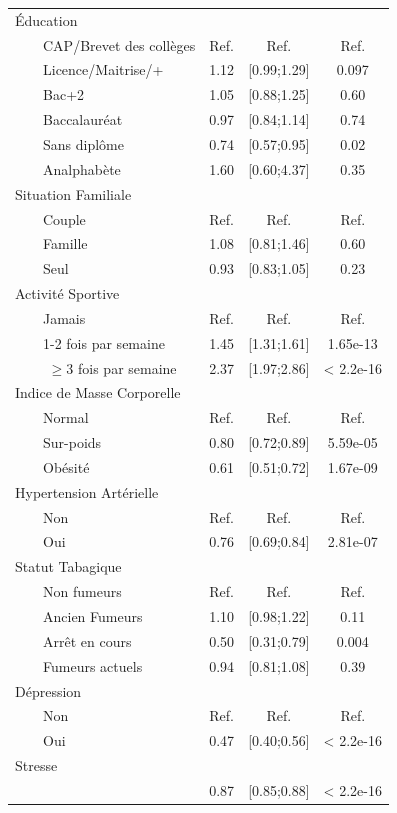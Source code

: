 \documentclass{book}
\begin{document}
\begin{longtable}{lccc}
 
Éducation&&&\\
$\qquad$CAP/Brevet des collèges &Ref.&Ref.&Ref.\\
$\qquad$Licence/Maitrise/+   &1.12 & [0.99;1.29] & 0.097 \\   
$\qquad$Bac+2       &1.05 & [0.88;1.25] & 0.60   \\  
$\qquad$Baccalauréat   &0.97& [0.84;1.14] & 0.74  \\        
$\qquad$Sans diplôme   &0.74 & [0.57;0.95] & 0.02\\
$\qquad$Analphabète &1.60& [0.60;4.37] & 0.35 \\   

         
Situation Familiale&&&\\
$\qquad$Couple&Ref.&Ref.&Ref.\\
$\qquad$Famille&1.08& [0.81;1.46]& 0.60\\    
$\qquad$Seul&0.93 & [0.83;1.05]& 0.23   \\

Activité Sportive&&&\\
$\qquad$Jamais & Ref.&Ref.&Ref.\\
$\qquad$1-2 fois par semaine&1.45& [1.31;1.61]& 1.65e-13\\
$\qquad$ $\geq$3 fois par semaine &2.37 &[1.97;2.86] &< 2.2e-16\\
                  

Indice de Masse Corporelle&&&\\
$\qquad$Normal &Ref.&Ref.&Ref.\\
$\qquad$Sur-poids &0.80 &[0.72;0.89]& 5.59e-05\\ 
$\qquad$Obésité&0.61& [0.51;0.72]& 1.67e-09\\ 

Hypertension Artérielle&&&\\
$\qquad$Non& Ref.&Ref.&Ref.\\
$\qquad$Oui &0.76 &[0.69;0.84]& 2.81e-07\\ 

Statut Tabagique&&&\\
$\qquad$Non fumeurs &Ref.&Ref.&Ref.\\
$\qquad$Ancien Fumeurs &1.10& [0.98;1.22]& 0.11\\    
$\qquad$Arrêt en cours &0.50 &[0.31;0.79]& 0.004\\ 
$\qquad$Fumeurs actuels &0.94& [0.81;1.08]& 0.39\\

Dépression&&&\\
$\qquad$Non&Ref.&Ref.&Ref.\\
$\qquad$Oui & 0.47 &[0.40;0.56]& < 2.2e-16\\
Stresse &&&\\
&0.87& [0.85;0.88]& < 2.2e-16\\ 
\hline
\end{longtable}
\end{document}
